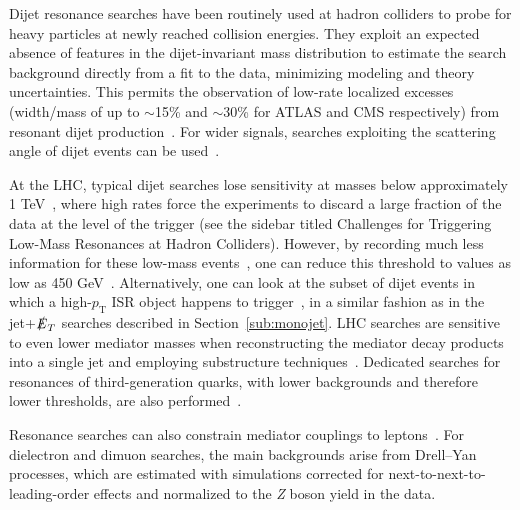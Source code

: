 \documentclass{ar-1col}
\newcommand{\pt}{\ensuremath{p_\mathrm{T}}\xspace}
\newcommand{\MET}{\ensuremath{\slashed{E}_T}\xspace}
\begin{document}
{Dijet resonance searches have been routinely used at hadron
colliders to probe for heavy particles at newly reached collision
energies. They exploit an expected absence of features in the
dijet-invariant mass distribution to estimate the search
background directly from a fit to the data, minimizing modeling
and theory uncertainties. This permits the observation of low-rate
localized excesses (width/mass of up to $\sim$15\% and $\sim$30\%
for ATLAS and CMS respectively) from resonant
dijet production~\cite{Aaboud:2017yvp,Sirunyan:2018xlo}. For
wider signals, searches exploiting the scattering angle of dijet
events can be used~\cite{CMS-PAS-EXO-16-046,Aaboud:2017yvp}.

At the LHC, typical dijet searches lose sensitivity at masses
below approximately 1 TeV~\cite{An:2012ue,Dobrescu:2013coa}, where high
rates force the experiments to discard a large fraction of the
data at the level of the trigger (see the sidebar titled Challenges for Triggering Low-Mass Resonances at Hadron Colliders). 
However, by recording much less
information for these low-mass
events~\cite{Khachatryan:2016ecr,Aaboud:2016leb}, 
one can reduce this threshold to values as low as 450
GeV~\cite{Sirunyan:2018xlo,Aaboud:2018fzt}.  
Alternatively, one can look at the subset of dijet events in which a
high-\pt{} ISR object happens to
trigger~\cite{ATLAS:2016bvn,Sirunyan:2017nvi}, in a similar fashion as in
the jet+\MET searches described in Section~\ref{sub:monojet}. 
LHC searches are sensitive to even lower mediator masses when
reconstructing the mediator decay products into a single jet and
employing substructure techniques~\cite{Sirunyan:2017nvi,Aaboud:2018zba}. 
Dedicated searches for resonances of third-generation
quarks, with lower backgrounds and therefore lower thresholds, are
also performed~\cite{Aaboud:2018tqo,CMS-PAS-HIG-16-025,Aaboud:2017hnm}.

Resonance searches can also constrain mediator couplings to 
leptons~\cite{Aaboud:2017buh,Khachatryan:2016zqb}. For dielectron
and dimuon searches, the main backgrounds arise from Drell--Yan
processes, which are estimated with simulations corrected for next-to-next-to-leading-order
effects and normalized to the \textit{Z} boson yield in the data.

}
\end{document}
